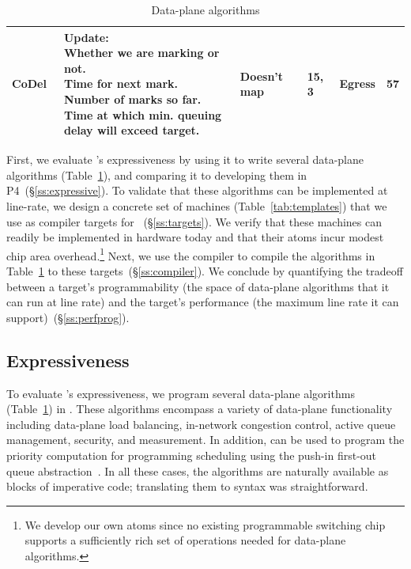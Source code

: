 \begin{table}[!t]
\begin{tabular}{|p{}|p{}|p{}|p{}|p{}|p{}|}
\hline
CoDel~\cite{codel} & \pbox{0.54\textwidth}{Update:\\Whether we are marking or not.\\Time for next mark.\\Number of marks so far.\\Time at which min. queuing delay will exceed target.}& Doesn't map & 15, 3 & Egress & 57 \\
\hline
\end{tabular}
\caption{Data-plane algorithms}
\label{tab:algos}
\end{table}

First, we evaluate \pktlanguage's expressiveness by using it to write several
data-plane algorithms (Table~\ref{tab:algos}), and comparing it to developing
them in P4~(\S\ref{ss:expressive}).  To validate that these algorithms can be
implemented at line-rate, we design a concrete set of \absmachine machines
(Table~\ref{tab:templates}) that we use as compiler targets for
\pktlanguage~(\S\ref{ss:targets}).  We verify that these machines can readily
be implemented in hardware today and that their atoms incur modest chip area
overhead.\footnote{We develop our own atoms since no existing programmable
switching chip supports a sufficiently rich set of operations needed for
data-plane algorithms.} Next, we use the \pktlanguage compiler to compile the
algorithms in Table~\ref{tab:algos} to these targets~(\S\ref{ss:compiler}).  We
conclude by quantifying the tradeoff between a target's programmability (the
space of data-plane algorithms that it can run at line rate) and the target's
performance (the maximum line rate it can support)~(\S\ref{ss:perfprog}).

\subsection{Expressiveness}
\label{ss:expressiveness}

To evaluate \pktlanguage's expressiveness, we program several data-plane
algorithms (Table~\ref{tab:algos}) in \pktlanguage. These algorithms encompass
a variety of data-plane functionality including data-plane load balancing,
in-network congestion control, active queue management, security, and
measurement. In addition, \pktlanguage can be used to program the priority
computation for programming scheduling using the push-in first-out queue
abstraction~\cite{pifo_hotnets}. In all these cases, the algorithms are
naturally available as blocks of imperative code; translating them to
\pktlanguage syntax was straightforward.

